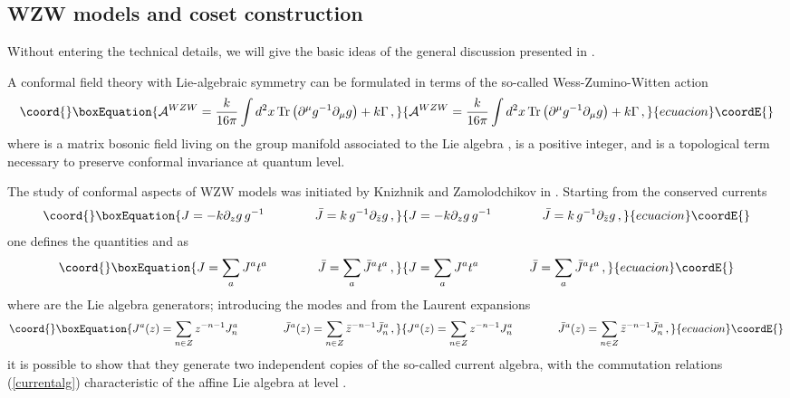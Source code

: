 \documentclass[a4paper,12pt]{report}
\begin{document}
\subsection{WZW models and coset construction}

Without entering the technical details, we will give the basic ideas of the general discussion presented in
\cite{dif}.

A conformal field theory with Lie-algebraic symmetry can be formulated in terms of the so-called
Wess-Zumino-Witten action
\begin{equation}\coord{}\boxEquation{\label{WZWaction}
{\cal A}^{WZW}=\frac{k}{16\pi}\int d^{2}x\,\textrm{Tr}\left(\partial^{\mu}g^{-1}\partial_{\mu}g\right)+k\Gamma\,,
}{{\cal A}^{WZW}=\frac{k}{16\pi}\int d^{2}x\,\textrm{Tr}\left(\partial^{\mu}g^{-1}\partial_{\mu}g\right)+k\Gamma\,,
}{ecuacion}\coordE{}\end{equation}
where \coordHE{} is a matrix bosonic field living on the group manifold \coordHE{} associated to the Lie algebra \coordHE{}, \coordHE{} is
a positive integer, and \myHighlight{$\Gamma$}\coordHE{} is a topological term necessary to preserve conformal invariance at quantum
level.

The study of conformal aspects of WZW models was initiated by Knizhnik and Zamolodchikov in \cite{knizam}.
Starting from the conserved currents
\begin{equation}\coord{}\boxEquation{
J=-k\partial_{z}g\,g^{-1}\qquad\qquad \bar{J}=k\,g^{-1}\partial_{\bar{z}}g \,,
}{
J=-k\partial_{z}g\,g^{-1}\qquad\qquad \bar{J}=k\,g^{-1}\partial_{\bar{z}}g \,,
}{ecuacion}\coordE{}\end{equation}
one defines the quantities \coordHE{} and \coordHE{} as
\begin{equation}\coord{}\boxEquation{
J=\sum_{a}J^{a}t^{a}\qquad\qquad \bar{J}=\sum_{a}\bar{J}^{a}t^{a}\,,
}{
J=\sum_{a}J^{a}t^{a}\qquad\qquad \bar{J}=\sum_{a}\bar{J}^{a}t^{a}\,,
}{ecuacion}\coordE{}\end{equation}
where \coordHE{} are the Lie algebra generators; introducing the modes \coordHE{} and \coordHE{} from the
Laurent expansions
\begin{equation}\coord{}\boxEquation{
J^{a}(z)=\sum_{n\in Z}z^{-n-1}J_{n}^{a}\qquad\qquad \bar{J}^{a}(z)=\sum_{n\in Z}\bar{z}^{-n-1}\bar{J}_{n}^{a}\,,
}{
J^{a}(z)=\sum_{n\in Z}z^{-n-1}J_{n}^{a}\qquad\qquad \bar{J}^{a}(z)=\sum_{n\in Z}\bar{z}^{-n-1}\bar{J}_{n}^{a}\,,
}{ecuacion}\coordE{}\end{equation}
it is possible to show that they generate two independent copies of the so-called current algebra, with the
commutation relations (\ref{currentalg}) characteristic of the affine Lie algebra \coordHE{} at level \coordHE{}.
\end{document}
